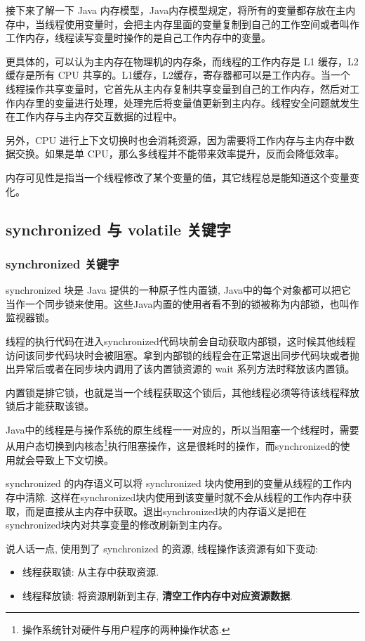 接下来了解一下 Java 内存模型，Java内存模型规定，将所有的变量都存放在主内存中，当线程使用变量时，会把主内存里面的变量复制到自己的工作空间或者叫作工作内存，线程读写变量时操作的是自己工作内存中的变量。

更具体的，可以认为主内存在物理机的内存条，而线程的工作内存是 L1 缓存，L2 缓存是所有 CPU 共享的。L1缓存，L2缓存，寄存器都可以是工作内存。当一个线程操作共享变量时，它首先从主内存复制共享变量到自己的工作内存，然后对工作内存里的变量进行处理，处理完后将变量值更新到主内存。线程安全问题就发生在工作内存与主内存交互数据的过程中。

另外，CPU 进行上下文切换时也会消耗资源，因为需要将工作内存与主内存中数据交换。如果是单 CPU，那么多线程并不能带来效率提升，反而会降低效率。

内存可见性是指当一个线程修改了某个变量的值，其它线程总是能知道这个变量变化。

\subsection{synchronized 与 volatile 关键字}

\subsubsection*{synchronized 关键字}

synchronized 块是 Java 提供的一种原子性内置锁, Java中的每个对象都可以把它当作一个同步锁来使用。这些Java内置的使用者看不到的锁被称为内部锁，也叫作监视器锁。

线程的执行代码在进入synchronized代码块前会自动获取内部锁，这时候其他线程访问该同步代码块时会被阻塞。拿到内部锁的线程会在正常退出同步代码块或者抛出异常后或者在同步块内调用了该内置锁资源的 wait 系列方法时释放该内置锁。

内置锁是排它锁，也就是当一个线程获取这个锁后，其他线程必须等待该线程释放锁后才能获取该锁。

Java中的线程是与操作系统的原生线程一一对应的，所以当阻塞一个线程时，需要从用户态切换到内核态\footnote{操作系统针对硬件与用户程序的两种操作状态.}执行阻塞操作，这是很耗时的操作，而synchronized的使用就会导致上下文切换。

synchronized 的内存语义可以将 synchronized 块内使用到的变量从线程的工作内存中清除. 这样在synchronized块内使用到该变量时就不会从线程的工作内存中获取，而是直接从主内存中获取。退出synchronized块的内存语义是把在synchronized块内对共享变量的修改刷新到主内存。

说人话一点, 使用到了 synchronized 的资源, 线程操作该资源有如下变动:
\begin{itemize}
    \item 线程获取锁: 从主存中获取资源.
    \item 线程释放锁: 将资源刷新到主存, \textbf{清空工作内存中对应资源数据}.
\end{itemize}

